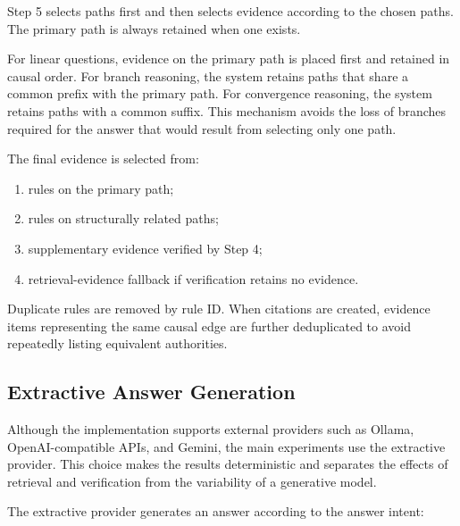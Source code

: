 Step 5 selects paths first and then selects evidence according to the chosen
paths. The primary path is always retained when one exists.

For linear questions, evidence on the primary path is placed first and
retained in causal order. For branch reasoning, the system retains paths
that share a common prefix with the primary path. For convergence reasoning,
the system retains paths with a common suffix. This mechanism avoids the
loss of branches required for the answer that would result from selecting
only one path.

The final evidence is selected from:

\begin{enumerate}
    \item rules on the primary path;
    \item rules on structurally related paths;
    \item supplementary evidence verified by Step 4;
    \item retrieval-evidence fallback if verification retains no evidence.
\end{enumerate}

Duplicate rules are removed by rule ID. When citations are created, evidence
items representing the same causal edge are further deduplicated to avoid
repeatedly listing equivalent authorities.

\subsection{Extractive Answer Generation}

Although the implementation supports external providers such as Ollama,
OpenAI-compatible APIs, and Gemini, the main experiments use the extractive
provider. This choice makes the results deterministic and separates the
effects of retrieval and verification from the variability of a generative
model.

The extractive provider generates an answer according to the answer intent:

